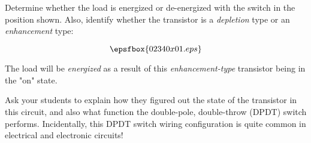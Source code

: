 

Determine whether the load is energized or de-energized with the switch in the position shown.  Also, identify whether the transistor is a {\it depletion} type or an {\it enhancement} type:

$$\epsfbox{02340x01.eps}$$







The load will be {\it energized} as a result of this {\it enhancement-type} transistor being in the "on" state.







Ask your students to explain how they figured out the state of the transistor in this circuit, and also what function the double-pole, double-throw (DPDT) switch performs.  Incidentally, this DPDT switch wiring configuration is quite common in electrical and electronic circuits!




